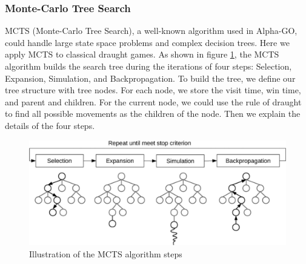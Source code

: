\subsubsection{Monte-Carlo Tree Search}
MCTS (Monte-Carlo Tree Search), a well-known algorithm used in Alpha-GO, could handle large state space problems and complex decision trees. Here we apply MCTS to classical draught games. As shown in figure \ref{fig:mcts}, the MCTS algorithm builds the search tree during the iterations of four steps: Selection, Expansion, Simulation, and Backpropagation. To build the tree, we define our tree structure with tree nodes. For each node, we store the visit time, win time, and parent and children. For the current node, we could use the rule of draught to find all possible movements as the children of the node. Then we explain the details of the four steps. 
\begin{figure}[t]
    \centering
    \includegraphics[width=\linewidth]{figures/mcts.png}
    \caption{Illustration of the MCTS algorithm steps}
    \label{fig:mcts}
\end{figure}

